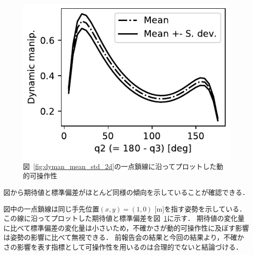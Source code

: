 \documentclass[10pt,a4j,twocolumn]{ltjsarticle}
\begin{document}
\begin{figure}
  \includegraphics[width=60truemm]{./dm_dist.pdf}
  \caption{図~\ref{fig:dyman_mean_std_2d}の一点鎖線に沿ってプロットした動的可操作性}
  \label{fig:dyman_mean_std_1d}
\end{figure}
図から期待値と標準偏差がほとんど同様の傾向を示していることが確認できる．

図中の一点鎖線は同じ手先位置$(x, y) = (1, 0)$ [m]を指す姿勢を示している．
この線に沿ってプロットした期待値と標準偏差を図~\ref{fig:dyman_mean_std_1d}に示す．
期待値の変化量に比べて標準偏差の変化量は小さいため，不確かさが動的可操作性に及ぼす影響は姿勢の影響に比べて無視できる．
前報告会の結果と今回の結果より，不確かさの影響を表す指標として可操作性を用いるのは合理的でないと結論づける．
\end{document}
